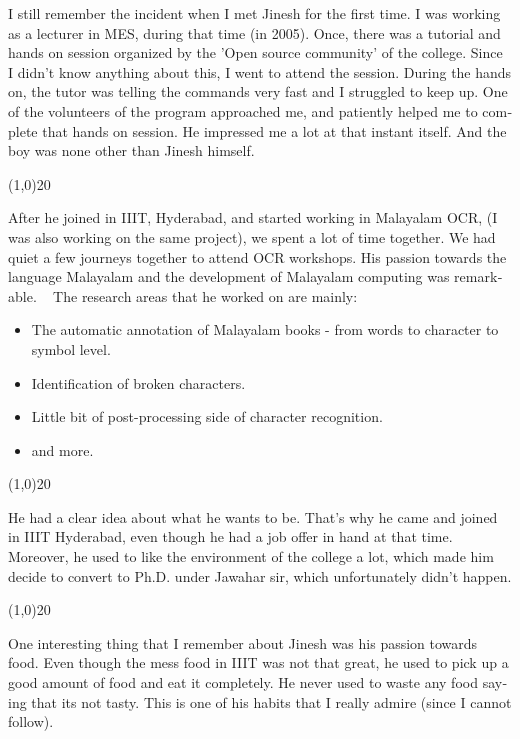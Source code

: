 \begin{english}
I still remember the incident when I met Jinesh for the first time. I was working as a lecturer in MES, during that time (in 2005). Once, there was a tutorial and hands on session organized by the 'Open source community' of the college. Since I didn’t know anything about this, I went to attend the session. During the hands on, the tutor was telling the commands very fast and I struggled to keep up. One of the volunteers of the program approached me, and patiently helped me to complete that hands on session. He impressed me a lot at that instant itself. And the boy was none other than Jinesh himself.
\begin{center}
\line(1,0){20} 
\end{center}
After he joined in IIIT, Hyderabad, and started working in Malayalam OCR, (I was also working on the same project), we spent a lot of time together. We had quiet a few journeys together to attend OCR workshops. His passion towards the language Malayalam and the development of Malayalam computing was remarkable.
 
The research areas that he worked on are mainly:
\begin{itemize}
\item The automatic annotation of Malayalam books - from words to character to symbol level.
\item Identification of broken characters.
\item Little bit of post-processing side of character recognition.
\item and more.
\end{itemize}
\begin{center}
\line(1,0){20} 
\end{center}
He had a clear idea about what he wants to be. That’s why he came and joined in IIIT Hyderabad, even though he had a job offer in hand at that time. Moreover, he used to like the environment of the college a lot, which made him decide to convert to Ph.D. under Jawahar sir, which unfortunately didn’t happen.
\begin{center}
\line(1,0){20} 
\end{center}
One interesting thing that I remember about Jinesh was his passion towards food. Even though the mess food in IIIT was not that great, he used to pick up a good amount of food and eat it completely. He never used to waste any food saying that its not tasty. This is one of his habits that I really admire (since I cannot follow).
\begin{center}

\end{center}
\end{english}
